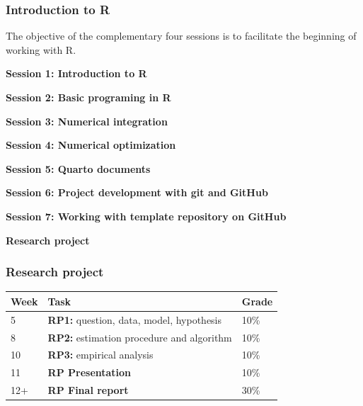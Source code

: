 \documentclass[notes,blackandwhite,mathsans]{beamer}
\begin{document}
\begin{frame}
\frametitle{Introduction to R}

\noindent The objective of the complementary four sessions is to facilitate the beginning of working with R. 

\bigskip\noindent\textbf{Session 1: {\color{mcxs2}Introduction to R}}

\bigskip\noindent\textbf{Session 2: {\color{mcxs1}Basic programing in R}}

\bigskip\noindent\textbf{Session 3: {\color{mcxs2}Numerical integration}}

\bigskip\noindent\textbf{Session 4: {\color{mcxs2}Numerical optimization}}


\bigskip\noindent\textbf{Session 5: {\color{mcxs2}Quarto documents}}

\bigskip\noindent\textbf{Session 6: {\color{mcxs2}Project development with git and GitHub}}

\bigskip\noindent\textbf{Session 7: {\color{mcxs2}Working with template repository on GitHub}}

\end{frame}





{
\begin{frame}

\begin{adjustwidth}{-0.5cm}{0cm}
\vspace{8.3cm}\Large
\textbf{{\color{mcxs2}Research} {\color{mcxs1}project}}
\end{adjustwidth}

\end{frame}
}





\begin{frame}
\frametitle{Research project}

\begin{center}
\begin{tabular}{ l l l }
\toprule 
Week & Task & Grade \\[1ex]
\midrule
5 & \textbf{RP1:} question, data, model, hypothesis & 10\% \\[1ex]
8 & \textbf{RP2:} estimation procedure and algorithm & 10\% \\[1ex]
10 & \textbf{RP3:} empirical analysis & 10\% \\[1ex]
11 & \textbf{RP Presentation} &  10\% \\[1ex]
12+ & \textbf{RP Final report} & 30\%   \\[1ex]
\bottomrule
\end{tabular}

\end{center}

\end{frame}
\end{document}
